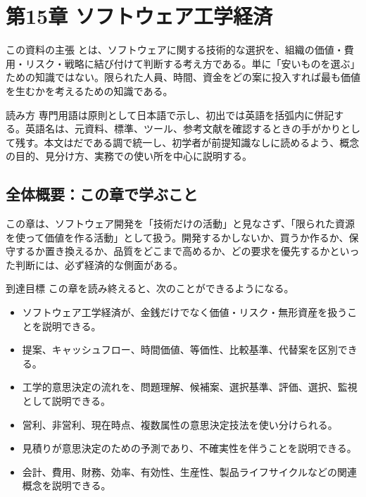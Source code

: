 \documentclass[a4paper,11pt]{ltjsarticle}
\numberwithin{figure}{section}
\numberwithin{table}{section}
\begin{document}
\section{第15章 ソフトウェア工学経済}
\begin{pointbox}{この資料の主張}
とは、ソフトウェアに関する技術的な選択を、組織の価値・費用・リスク・戦略に結び付けて判断する考え方である。単に「安いものを選ぶ」ための知識ではない。限られた人員、時間、資金をどの案に投入すれば最も価値を生むかを考えるための知識である。
\end{pointbox}

\begin{notebox}{読み方}
専門用語は原則として日本語で示し、初出では英語を括弧内に併記する。英語名は、元資料、標準、ツール、参考文献を確認するときの手がかりとして残す。本文はだである調で統一し、初学者が前提知識なしに読めるよう、概念の目的、見分け方、実務での使い所を中心に説明する。
\end{notebox}



\subsection*{全体概要：この章で学ぶこと}

この章は、ソフトウェア開発を「技術だけの活動」と見なさず、「限られた資源を使って価値を作る活動」として扱う。開発するかしないか、買うか作るか、保守するか置き換えるか、品質をどこまで高めるか、どの要求を優先するかといった判断には、必ず経済的な側面がある。

到達目標 この章を読み終えると、次のことができるようになる。
\begin{itemize}
  \item ソフトウェア工学経済が、金銭だけでなく価値・リスク・無形資産を扱うことを説明できる。
  \item 提案、キャッシュフロー、時間価値、等価性、比較基準、代替案を区別できる。
  \item 工学的意思決定の流れを、問題理解、候補案、選択基準、評価、選択、監視として説明できる。
  \item 営利、非営利、現在時点、複数属性の意思決定技法を使い分けられる。
  \item 見積りが意思決定のための予測であり、不確実性を伴うことを説明できる。
  \item 会計、費用、財務、効率、有効性、生産性、製品ライフサイクルなどの関連概念を説明できる。
\end{itemize}
\end{document}
